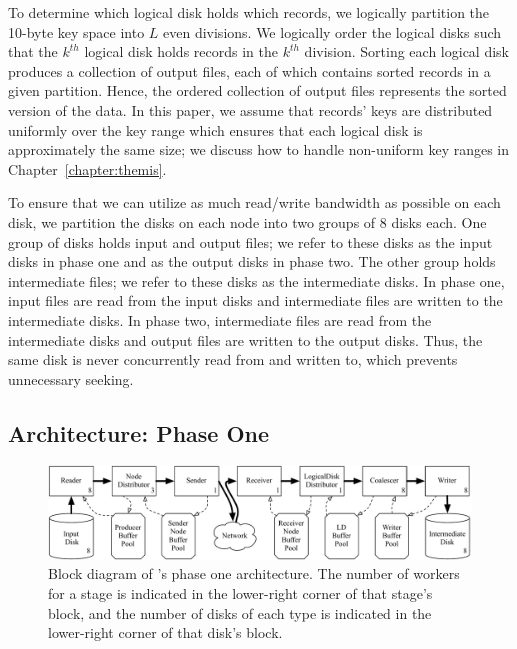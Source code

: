 To determine which logical disk holds which records, we logically partition the
10-byte key space into $L$ even divisions.  We logically order the logical
disks such that the $k^{th}$ logical disk holds records in the $k^{th}$
division.  Sorting each logical disk produces a collection of output files,
each of which contains sorted records in a given partition.  Hence, the ordered
collection of output files represents the sorted version of the data.  In this
paper, we assume that records' keys are distributed uniformly over the key
range which ensures that each logical disk is approximately the same size; we
discuss how to handle non-uniform key ranges in Chapter~\ref{chapter:themis}.

To ensure that we can utilize as much read/write bandwidth as possible on each
disk, we partition the disks on each node into two groups of 8 disks each. One
group of disks holds input and output files; we refer to these disks as the
input disks in phase one and as the output disks in phase two.  The other group
holds intermediate files; we refer to these disks as the intermediate disks.
In phase one, input files are read from the input disks and intermediate files
are written to the intermediate disks. In phase two, intermediate files are
read from the intermediate disks and output files are written to the output
disks. Thus, the same disk is never concurrently read from and written to,
which prevents unnecessary seeking.

\subsection{\tritonsort Architecture: Phase One}

\begin{figure}
  \centering \includegraphics[width=\textwidth]{tritonsort/figs/phase1.pdf}

  \caption{Block diagram of \tritonsort's phase one architecture.  The
    number of workers for a stage is indicated in the lower-right corner of
    that stage's block, and the number of disks of each type is indicated in
    the lower-right corner of that disk's block.}

  \label{fig:phase1}
\end{figure}

